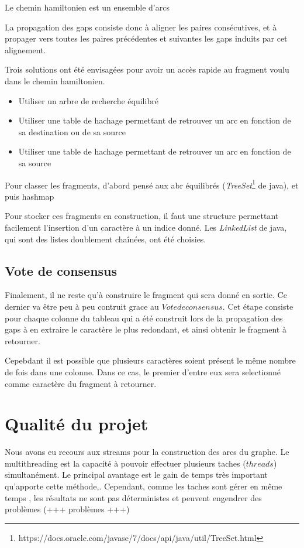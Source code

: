 \documentclass{article}
\begin{document}
Le chemin hamiltonien est un ensemble d'arcs 

La propagation des gaps consiste donc à aligner les paires consécutives, et à propager vers toutes les paires précédentes et suivantes les gaps induits par cet alignement.

Trois solutions ont été envisagées pour avoir un accès rapide au fragment voulu dans le chemin hamiltonien.
\begin{itemize}
\item Utiliser un arbre de recherche équilibré 
\item Utiliser une table de hachage permettant de retrouver un arc en fonction de sa destination ou de sa source


\item Utiliser une table de hachage permettant de retrouver un arc en fonction de sa source
\end{itemize}



Pour classer les fragments, d'abord pensé aux abr équilibrés (\textit{TreeSet}\footnote{https://docs.oracle.com/javase/7/docs/api/java/util/TreeSet.html} de java), et puis hashmap

Pour stocker ces fragments en construction, il faut une structure permettant facilement l'insertion d'un caractère à un indice donné. Les \textit{LinkedList} de java, qui sont des listes doublement chaînées, ont été choisies.

\subsection{Vote de consensus}

Finalement, il ne reste qu'à construire le fragment qui sera donné en sortie. Ce dernier va être peu à peu contruit grace au $Vote de consensus$. Cet étape consiste pour chaque colonne du tableau qui a été construit lors de la propagation des gaps à en extraire le caractère le plus redondant, et ainsi obtenir le fragment à retourner.

Cepebdant il est possible que plusieurs caractères soient présent le même nombre de fois dans une colonne. Dans ce cas, le premier d'entre eux sera selectionné comme caractère du fragment à retourner.

\section{Qualité du projet}

Nous avons eu recours aux streams pour la construction des arcs du graphe. Le multithreading est la capacité à pouvoir effectuer plusieurs taches ($threads$) simultanément. Le principal avantage est le gain de temps très important qu'apporte cette méthode,. Cependant, comme les taches sont gérer en même temps , les résultats ne sont pas déterministes et peuvent engendrer des problèmes (+++ problèmes +++)
\end{document}
